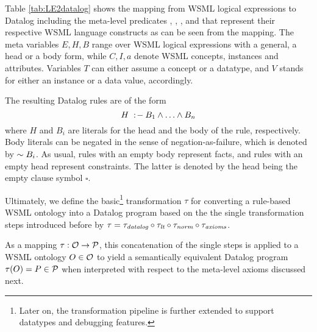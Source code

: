 Table \ref{tab:LE2datalog} shows the mapping from WSML logical
expressions to Datalog including the meta-level predicates \psco,
\pmo, \phval, \pitype and \potype that represent their respective
WSML language constructs as can be seen from the mapping. The meta
variables $E,H,B$ range over WSML logical expressions with a
general, a head or a body form, while $C,I,a$ denote WSML
concepts, instances and attributes. Variables $T$ can either
assume a concept or a datatype, and $V$ stands for either an
instance or a data value, accordingly.

The resulting Datalog rules are of the form $$H \lprl B_1 \dlogand
\dots \dlogand B_n$$ where $H$ and $B_i$ are literals for the head
and the body of the rule, respectively. Body literals can be
negated in the sense of negation-as-failure, which is denoted by
$\dlognot B_i$. As usual, rules with an empty body represent
facts, and rules with an empty head represent constraints. The
latter is denoted by the head being the empty clause symbol
$\square$.

\medskip

Ultimately, we define the basic\footnote{Later on, the
transformation pipeline is further extended to support datatypes
and debugging features.} transformation $\tau$ for converting a
rule-based WSML ontology into a Datalog program based on the the
single transformation steps introduced before by $ \tau =
\transdlog \circ \translt \circ \transnorm \circ \transax$.

As a mapping $\tau: \O \rightarrow \P$, this concatenation of the
single steps is applied to a WSML ontology $O \in \O$ to yield a
semantically equivalent Datalog program $\tau (O) = P \in \P$ when
interpreted with respect to the meta-level axioms discussed next.
